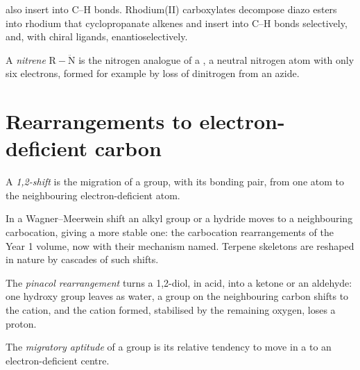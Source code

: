  also insert into C--H bonds. Rhodium(II) carboxylates
decompose diazo esters into rhodium  that cyclopropanate alkenes and
insert into C--H bonds selectively, and, with chiral ligands, enantioselectively.

\begin{definition}[Nitrenes]\label{def:b3:radicals-carbenes:nitrene}
A \emph{nitrene} $\mathrm{R{-}\ddot N}$ is the nitrogen analogue of a , a neutral
nitrogen atom with only six electrons, formed for example by loss of
dinitrogen from an azide.
\end{definition}

\section{Rearrangements to electron-deficient carbon}

\begin{definition}[1,2-Shift]\label{def:b3:radicals-carbenes:shift}
A \emph{1,2-shift} is the migration of a group, with its bonding
pair, from one atom to the neighbouring electron-deficient atom.
\end{definition}

In a Wagner--Meerwein shift an alkyl group or a hydride moves to a neighbouring
carbocation, giving a more stable one: the carbocation rearrangements of the
Year 1 volume, now with their mechanism named. Terpene skeletons are reshaped
in nature by cascades of such shifts.

\begin{definition}\label{def:b3:radicals-carbenes:pinacol}
The \emph{pinacol rearrangement} turns a 1,2-diol,
in acid, into a ketone or an aldehyde: one hydroxy group leaves as water, a
group on the neighbouring carbon shifts to the cation, and the cation formed,
stabilised by the remaining oxygen, loses a proton.
\end{definition}

\begin{definition}\label{def:b3:radicals-carbenes:migratory}
The \emph{migratory aptitude} of a group is its
relative tendency to move in a  to an electron-deficient centre.
\end{definition}

